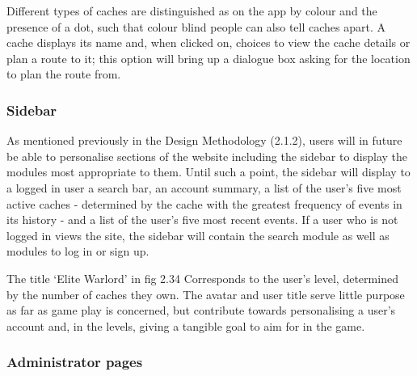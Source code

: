 Different types of caches are distinguished as on the app by colour and the presence of a dot, such that colour blind people can also tell caches apart. A cache displays its name and, when clicked on, choices to view the cache details or plan a route to it; this option will bring up a dialogue box asking for the location to plan the route from.

\subsubsection{Sidebar}

As mentioned previously in the Design Methodology (2.1.2), users will in future be able to personalise sections of the website including the sidebar to display the modules most appropriate to them. Until such a point, the sidebar will display to a logged in user a search bar, an account summary, a list of the user's five most active caches - determined by the cache with the greatest frequency of events in its history - and a list of the user's five most recent events. If a user who is not logged in views the site, the sidebar will contain the search module as well as modules to log in or sign up.

The title `Elite Warlord' in fig 2.34 Corresponds to the user's level, determined by the number of caches they own. The avatar and user title serve little purpose as far as game play is concerned, but contribute towards personalising a user's account and, in the levels, giving a tangible goal to aim for in the game.

\subsubsection{Administrator pages}


